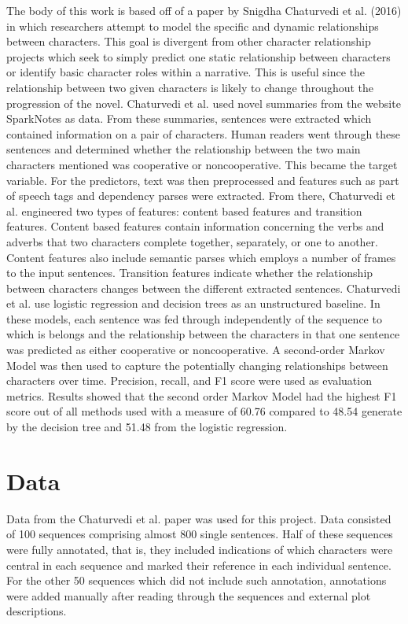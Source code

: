 \documentclass[11pt,a4paper]{article}
\begin{document}
The body of this work is based off of a paper by Snigdha Chaturvedi et al. (2016) in which researchers attempt to model the specific and dynamic relationships between characters. This goal is divergent from other character relationship projects which seek to simply predict one static relationship between characters or identify basic character roles within a narrative. This is useful since the relationship between two given characters is likely to change throughout the progression of the novel. Chaturvedi et al. used novel summaries from the website SparkNotes as data. From these summaries, sentences were extracted which contained information on a pair of characters. Human readers went through these sentences and determined whether the relationship between the two main characters mentioned was cooperative or noncooperative. This became the target variable. For the predictors, text was then preprocessed and features such as part of speech tags and dependency parses were extracted. From there, Chaturvedi et al. engineered two types of features: content based features and transition features. 
Content based features contain information concerning the verbs and adverbs that two characters complete together, separately, or one to another. Content features also include semantic parses which employs a number of frames to the input sentences. Transition features indicate whether the relationship between characters changes between the different extracted sentences. 
Chaturvedi et al. use logistic regression and decision trees as an unstructured baseline. In these models, each sentence was fed through independently of the sequence to which is belongs and the relationship between the characters in that one sentence was predicted as either cooperative or noncooperative. A second-order Markov Model was then used to capture the potentially changing relationships between characters over time. Precision, recall, and F1 score were used as evaluation metrics. Results showed that the second order Markov Model had the highest F1 score out of all methods used with a measure of 60.76 compared to 48.54 generate by the decision tree and 51.48 from the logistic regression. 

\section{Data}
Data from the Chaturvedi et al. paper was used for this project. Data consisted of 100 sequences comprising almost 800 single sentences. Half of these sequences were fully annotated, that is, they included indications of which characters were central in each sequence and marked their reference in each individual sentence. For the other 50 sequences which did not include such annotation, annotations were added manually after reading through the sequences and external plot descriptions.
\end{document}

